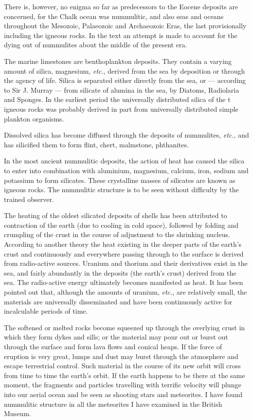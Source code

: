 \documentclass[a4paper, 12pt, oneside]{article}
\begin{document}
There is, however, no enigma so far as predecessors to the Eocene deposits are concerned, for the Chalk ocean was nummulitic, and also seas and oceans throughout the Mesozoic, Palaeozoic and Archaeozoic Eras, the last provisionally including the igneous rocks. In the text an attempt is made to account for the dying out of nummulites about the middle of the present era.

The marine limestones are benthoplankton deposits. They contain a varying amount of silica, magnesium, \emph{etc.}, derived from the sea by deposition or through the agency of life. Silica is separated either directly from the sea, or --- according to Sir J. Murray --- from silicate of alumina in the sea, by Diatoms, Radiolaria and Sponges. In the earliest period the universally distributed silica of the t igneous rocks was probably derived in part from universally distributed simple plankton organisms.

Dissolved silica has become diffused through the deposits of nummulites, \emph{etc.}, and has silicified them to form flint, chert, malmstone, phthanites.

In the most ancient nummulitic deposits, the action of heat has caused the silica to enter into combination with aluminium, magnesium, calcium, iron, sodium and potassium to form silicates. These crystalline masses of silicates are known as igneous rocks. The nummulitic structure is to be seen without difficulty by the trained observer.

The heating of the oldest silicated deposits of shells has been attributed to contraction of the earth (due to cooling in cold space), followed by folding and crumpling of the crust in the course of adjustment to the shrinking nucleus. According to another theory the heat existing in the deeper parts of the earth's crust and continuously and everywhere passing through to the surface is derived from radio-active sources. Uranium and thorium and their derivatives exist in the sea, and fairly abundantly in the deposits (the earth's crust) derived from the sea. The radio-active energy ultimately becomes manifested as heat. It has been pointed out that, although the amounts of uranium, \emph{etc.}, are relatively small, the materials are universally disseminated and have been continuously active for incalculable periods of time.

The softened or melted rocks become squeezed up through the overlying crust in which they form dykes and sills; or the material may pour out or burst out through the surface and form lava flows and conical heaps. If the force of eruption is very great, lumps and dust may burst through the atmosphere and escape terrestrial control. Such material in the course of its new orbit will cross from time to time the earth's orbit. If the earth happens to be there at the same moment, the fragments and particles travelling with terrific velocity will plunge into our aerial ocean and be seen as shooting stars and meteorites. I have found nummulitic structure in all the meteorites I have examined in the British Museum.
\end{document}
